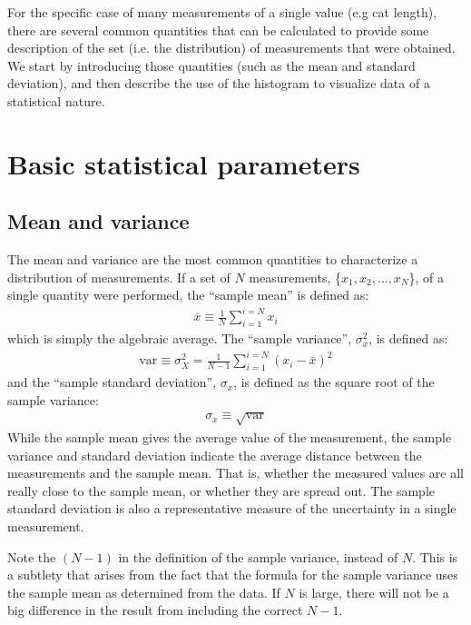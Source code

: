 For the specific case of many measurements of a single value (e.g cat length), there are several common quantities that can be calculated to provide some description of the set (i.e. the distribution) of measurements that were obtained. We start by introducing those quantities (such as the mean and standard deviation), and then describe the use of the histogram to visualize data of a statistical nature.

\section{Basic statistical parameters}

\subsection{Mean and variance}

The mean and variance are the most common quantities to characterize a distribution of measurements. If a set of $N$ measurements, \{$x_1, x_2, \dots,x_N$\}, of a single quantity were performed, the ``sample mean'' is defined as:
\begin{align}
 \bar{x} \equiv \frac{1}{N} \sum_{i=1}^{i=N} x_i  
\end{align}
which is simply the algebraic average. The ``sample variance'', $\sigma_x^2$, is defined as:
\begin{align}
 \text{var}\equiv \sigma_X^2 = \frac{1}{N-1} \sum_{i=1}^{i=N} (x_i-\bar{x})^2 
\end{align}
and the ``sample standard deviation'', $\sigma_x$, is defined as the square root of the sample variance:
\begin{align}
 \sigma_x\equiv\sqrt{\text{var}}
\end{align}
While the sample mean gives the average value of the measurement, the sample variance and standard deviation indicate the average distance between the measurements and the sample mean. That is, whether the measured values are all really close to the sample mean, or whether they are spread out. The sample standard deviation is also a representative measure of the uncertainty in a single measurement. 

Note the $(N-1)$ in the definition of the sample variance, instead of $N$. This is a subtlety that arises from the fact that the formula for the sample variance uses the sample mean as determined from the data. If $N$ is large, there will not be a big difference in the result from including the correct $N-1$.

